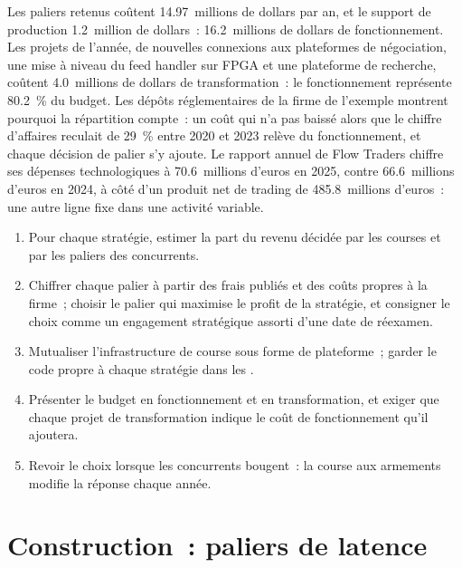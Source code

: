 Les paliers retenus coûtent 14.97~millions de dollars par an, et le support de production 1.2~million de dollars~: 16.2~millions de dollars de fonctionnement. Les projets de l'année, de nouvelles
connexions aux plateformes de négociation, une mise à niveau du feed handler sur FPGA et une plateforme de recherche, coûtent 4.0~millions de dollars de transformation~: le fonctionnement représente 80.2~\% du
budget. Les dépôts réglementaires de la firme de l'exemple montrent pourquoi la répartition compte~: un coût qui n'a pas baissé alors que le chiffre d'affaires reculait de 29~\% entre 2020 et 2023 relève du fonctionnement, et chaque décision de palier s'y ajoute.
Le rapport annuel de Flow Traders chiffre ses dépenses technologiques à 70.6~millions d'euros en 2025, contre 66.6~millions d'euros en 2024, à côté d'un produit net de trading
de 485.8~millions d'euros~: une autre ligne fixe dans une activité variable.

\begin{method}\label{met:fm:technology-strategy:set}
\begin{enumerate}
\item Pour chaque stratégie, estimer la part du revenu décidée par les courses et par les paliers des concurrents.
\item Chiffrer chaque palier à partir des frais publiés et des coûts propres à la firme~; choisir le palier qui maximise le profit de la stratégie, et consigner le choix
comme un engagement stratégique assorti d'une date de réexamen.
\item Mutualiser l'infrastructure de course sous forme de plateforme~; garder le code propre à chaque stratégie dans les .
\item Présenter le budget en fonctionnement et en transformation, et exiger que chaque projet de transformation indique le coût de fonctionnement qu'il ajoutera.
\item Revoir le choix lorsque les concurrents bougent~: la course aux armements modifie la réponse chaque année.
\end{enumerate}
\end{method}

\section{Construction~: paliers de latence}\label{bld:fm:technology-strategy:techtier}

